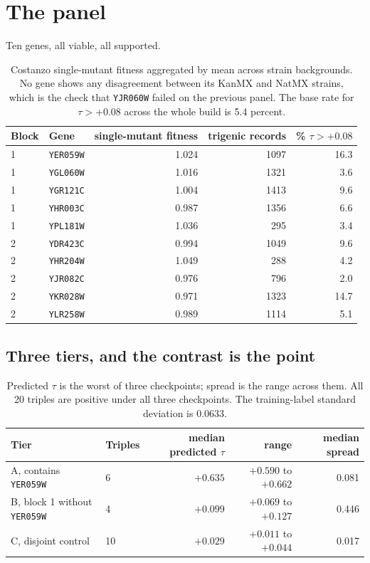 \section{The panel}

Ten genes, all viable, all supported.

\begin{table}[H]
\centering
\begin{tabular}{llrrr}
\toprule
Block & Gene & single-mutant fitness & trigenic records & \% $\tau > +0.08$ \\
\midrule
1 & \texttt{YER059W} & 1.024 & 1097 & 16.3 \\
1 & \texttt{YGL060W} & 1.016 & 1321 & 3.6 \\
1 & \texttt{YGR121C} & 1.004 & 1413 & 9.6 \\
1 & \texttt{YHR003C} & 0.987 & 1356 & 6.6 \\
1 & \texttt{YPL181W} & 1.036 & 295  & 3.4 \\
\midrule
2 & \texttt{YDR423C} & 0.994 & 1049 & 9.6 \\
2 & \texttt{YHR204W} & 1.049 & 288  & 4.2 \\
2 & \texttt{YJR082C} & 0.976 & 796  & 2.0 \\
2 & \texttt{YKR028W} & 0.971 & 1323 & 14.7 \\
2 & \texttt{YLR258W} & 0.989 & 1114 & 5.1 \\
\bottomrule
\end{tabular}
\caption{Costanzo single-mutant fitness aggregated by mean across strain
backgrounds. No gene shows any disagreement between its KanMX and NatMX strains,
which is the check that \texttt{YJR060W} failed on the previous panel. The base
rate for $\tau > +0.08$ across the whole build is 5.4 percent.}
\end{table}

\subsection{Three tiers, and the contrast is the point}

\begin{table}[H]
\centering
\begin{tabular}{llrrr}
\toprule
Tier & Triples & median predicted $\tau$ & range & median spread \\
\midrule
A, contains \texttt{YER059W}      & 6  & $+0.635$ & $+0.590$ to $+0.662$ & 0.081 \\
B, block 1 without \texttt{YER059W} & 4  & $+0.099$ & $+0.069$ to $+0.127$ & 0.446 \\
C, disjoint control               & 10 & $+0.029$ & $+0.011$ to $+0.044$ & 0.017 \\
\bottomrule
\end{tabular}
\caption{Predicted $\tau$ is the worst of three checkpoints; spread is the range
across them. All 20 triples are positive under all three checkpoints. The
training-label standard deviation is $0.0633$.}
\end{table}


